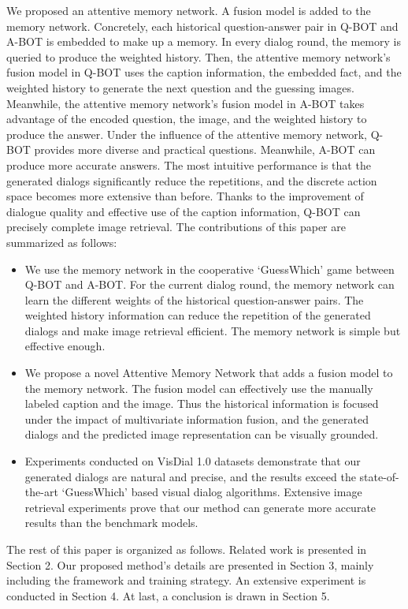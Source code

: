 \documentclass[review]{elsarticle}
\begin{document}
	We proposed an attentive memory network. A fusion model is added to the memory network. Concretely, each historical question-answer pair in Q-BOT and A-BOT is embedded to make up a memory. In every dialog round, the memory is queried to produce the weighted history. Then, the attentive memory network's fusion model in Q-BOT uses the caption information, the embedded fact, and the weighted history to generate the next question and the guessing images.
	Meanwhile, the attentive memory network's fusion model in A-BOT takes advantage of the encoded question, the image, and the weighted history to produce the answer. Under the influence of the attentive memory network, Q-BOT provides more diverse and practical questions. Meanwhile, A-BOT can produce more accurate answers. The most intuitive performance is that the generated dialogs significantly reduce the repetitions, and the discrete action space becomes more extensive than before. Thanks to the improvement of dialogue quality and effective use of the caption information, Q-BOT can precisely complete image retrieval. 
	The contributions of this paper are summarized as follows: 
	\begin{itemize}
		\item We use the memory network in the cooperative `GuessWhich' game between Q-BOT and A-BOT. For the current dialog round, the memory network can learn the different weights of the historical question-answer pairs. The weighted history information can reduce the repetition of the generated dialogs and make image retrieval efficient. The memory network is simple but effective enough.
		\item We propose a novel Attentive Memory Network that adds a fusion model to the memory network. The fusion model can effectively use the manually labeled caption and the image.  Thus the historical information is focused under the impact of multivariate information fusion, and the generated dialogs and the predicted image representation can be visually grounded.
		\item Experiments conducted on VisDial 1.0 datasets demonstrate that our generated dialogs are natural and precise, and the results exceed the state-of-the-art `GuessWhich' based visual dialog algorithms. Extensive image retrieval experiments prove that our method can generate more accurate results than the benchmark models.
	\end{itemize} 
	
	The rest of this paper is organized as follows. Related work is presented in Section 2. Our proposed method's details are presented in Section 3, mainly including the framework and training strategy. An extensive experiment is conducted in Section 4. At last, a conclusion is drawn in Section 5.
	
\end{document}
